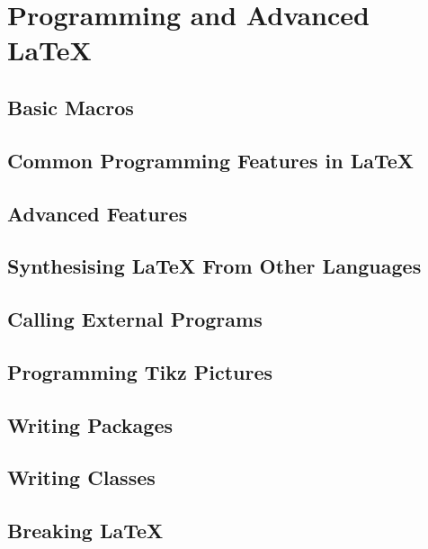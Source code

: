 \section{Programming and Advanced LaTeX}

\subsection{Basic Macros}


\subsection{Common Programming Features in LaTeX}


\subsection{Advanced Features} \label{section:programming/advancedFeatures}


\subsection{Synthesising \LaTeX{} From Other Languages}


\subsection{Calling External Programs}


\subsection{Programming Tikz Pictures}


\subsection{Writing Packages}


\subsection{Writing Classes}


\subsection{Breaking \LaTeX}


